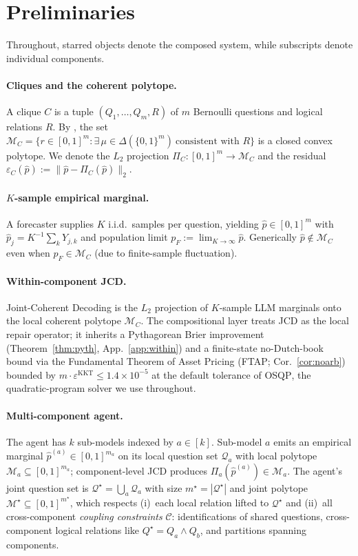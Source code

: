 \documentclass{article}
\theoremstyle{plain}
\theoremstyle{definition}
\theoremstyle{remark}
\newcommand{\MC}{\mathcal{M}_C}
\newcommand{\Mloc}{\mathcal{M}_a}
\newcommand{\Mjoint}{\mathcal{M}^{\star}}
\newcommand{\Cset}{\mathcal{C}}
\newcommand{\hpK}{\hat p}
\newcommand{\pF}{p_F}
\newcommand{\eps}{\varepsilon}
\begin{document}
\section{Preliminaries}
\label{sec:setup}

Throughout, starred objects denote the composed system, while
subscripts denote individual components.

\paragraph{Cliques and the coherent polytope.}
A clique $C$ is a tuple $(Q_1,\dots,Q_m, R)$ of $m$ Bernoulli
questions and logical relations $R$. By
\citet{definetti1937foresight}, the set
\(
\MC = \{r\in[0,1]^m : \exists\,\mu\in\Delta(\{0,1\}^m)\
\text{consistent with } R\}
\)
is a closed convex polytope. We denote the $L_2$ projection
$\Pi_C: [0,1]^m \to \MC$ and the residual
$\eps_C(\hpK) := \|\hpK - \Pi_C(\hpK)\|_2$.

\paragraph{$K$-sample empirical marginal.}
A forecaster supplies $K$ i.i.d.\ samples per question, yielding
$\hpK \in [0,1]^m$ with $\hpK_j = K^{-1}\sum_k Y_{j,k}$ and population
limit $\pF := \lim_{K\to\infty}\hpK$. Generically $\hpK \notin \MC$
even when $\pF\in\MC$ (due to finite-sample fluctuation).

\paragraph{Within-component JCD.}
\label{sec:percall}
Joint-Coherent Decoding is the $L_2$ projection of $K$-sample LLM
marginals onto the local coherent polytope $\MC$. The compositional
layer treats JCD as the local repair operator; it inherits a
Pythagorean Brier improvement (Theorem~\ref{thm:pyth},
App.~\ref{app:within}) and a finite-state no-Dutch-book bound
via the Fundamental Theorem of Asset Pricing (FTAP;
Cor.~\ref{cor:noarb}) bounded by
$m\cdot\eps^{\mathrm{KKT}}\!\le\!1.4\!\times\!10^{-5}$ at the
default tolerance of \textsc{OSQP}, the quadratic-program solver
we use throughout.

\paragraph{Multi-component agent.}
The agent has $k$ sub-models indexed by $a \in [k]$. Sub-model $a$
emits an empirical marginal $\hpK^{(a)} \in [0,1]^{m_a}$ on its local
question set $\mathcal{Q}_a$ with local polytope $\Mloc \subseteq
[0,1]^{m_a}$; component-level JCD produces
$\Pi_a(\hpK^{(a)}) \in \Mloc$. The agent's joint question set is
$\mathcal{Q}^\star = \bigcup_a \mathcal{Q}_a$ with size
$m^\star = |\mathcal{Q}^\star|$ and joint polytope
$\Mjoint \subseteq [0,1]^{m^\star}$, which respects (i)~each local
relation lifted to $\mathcal{Q}^\star$ and (ii)~all cross-component
\emph{coupling constraints} $\Cset$: identifications of shared
questions, cross-component logical relations like
$Q^\star = Q_a \wedge Q_b$, and partitions spanning components.
\end{document}
